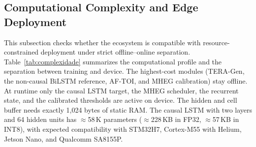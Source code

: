 \documentclass[a4paper,fleqn]{cas-dc}
\newcommand{\TERAGen}{\mbox{TERA-Gen}\xspace}
\newcommand{\AFTOI}{\mbox{AF-TOI}\xspace}
\newcommand{\MHEG}{\mbox{MHEG}\xspace}
\begin{document}
\subsection{Computational Complexity and Edge Deployment}
\label{sec:complexidade}
This subsection checks whether the ecosystem is compatible with resource-constrained deployment under strict offline--online separation.
Table~\ref{tab:complexidade} summarizes the computational profile and the
separation between training and device. The highest-cost modules (\TERAGen, the
non-causal BiLSTM reference, \AFTOI, and \MHEG calibration) stay offline. At
runtime only the causal LSTM target, the \MHEG scheduler, the recurrent state,
and the calibrated thresholds are active on device.
The hidden and cell buffer needs exactly 1,024 bytes of static RAM. The causal
LSTM with two layers and 64 hidden units has $\approx$58\,K parameters
($\approx$228\,KB in FP32, $\approx$57\,KB in INT8), with expected compatibility
with STM32H7, Cortex-M55 with Helium, Jetson Nano, and Qualcomm SA8155P.
\end{document}
